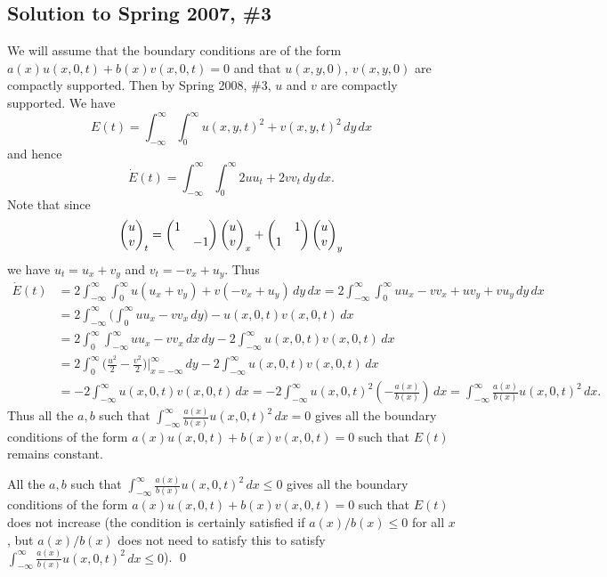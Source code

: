 \subsection*{Solution to Spring 2007, \#3}\label{s073}
We will assume that the boundary conditions are of the form
$a(x)u(x, 0, t) + b(x)v(x, 0, t) = 0$ and that $u(x, y, 0)$, $v(x, y, 0)$
are compactly supported. Then by Spring 2008, \#3, $u$ and $v$ are compactly supported.
We have
$$E(t) = \int_{-\infty}^{\infty}\int_{0}^{\infty}u(x, y, t)^{2} + v(x, y, t)^{2}\, dy\, dx$$
and hence
$$\dot{E}(t) = \int_{-\infty}^{\infty}\int_{0}^{\infty}2uu_{t} + 2vv_{t}\, dy\, dx.$$
Note that since
$$\begin{pmatrix} u \\ v\end{pmatrix}_{t} = \begin{pmatrix} 1 &  \\  & -1\end{pmatrix}\begin{pmatrix} u \\ v\end{pmatrix}_{x} + \begin{pmatrix}  & 1 \\ 1 & \end{pmatrix}\begin{pmatrix} u \\ v\end{pmatrix}_{y}$$
we have
$u_{t} = u_{x} + v_{y}$ and $v_{t} = -v_{x} + u_{y}$.
Thus
\begin{align*}
\dot{E}(t) &= 2\int_{-\infty}^{\infty}\int_{0}^{\infty}u(u_{x} + v_{y}) + v(-v_{x} + u_{y})\, dy\, dx = 2\int_{-\infty}^{\infty}\int_{0}^{\infty}uu_{x} - vv_{x} + uv_{y} + vu_{y}\, dy\, dx\\
&=2\int_{-\infty}^{\infty}\bigg(\int_{0}^{\infty}uu_{x} - vv_{x}\, dy\bigg) - u(x, 0, t)v(x, 0, t)\, dx\\
& = 2\int_{0}^{\infty}\int_{-\infty}^{\infty}uu_{x} - vv_{x}\, dx\, dy - 2\int_{-\infty}^{\infty}u(x, 0, t)v(x, 0, t)\, dx\\
&= 2\int_{0}^{\infty}\bigg(\frac{u^{2}}{2} - \frac{v^{2}}{2}\bigg)\bigg|_{x = -\infty}^{\infty}\, dy - 2\int_{-\infty}^{\infty}u(x, 0, t)v(x, 0, t)\, dx\\
&= -2\int_{-\infty}^{\infty}u(x, 0, t)v(x, 0, t)\, dx = -2\int_{-\infty}^{\infty}u(x, 0, t)^{2}(-\frac{a(x)}{b(x)})\, dx = \int_{-\infty}^{\infty}\frac{a(x)}{b(x)}u(x, 0, t)^{2}\, dx.
\end{align*}
Thus all the $a, b$ such that $\int_{-\infty}^{\infty}\frac{a(x)}{b(x)}u(x, 0, t)^{2}\, dx = 0$ gives all the boundary
conditions of the form $a(x)u(x, 0, t) + b(x)v(x, 0, t) = 0$ such that $E(t)$ remains constant.

All the $a, b$ such that $\int_{-\infty}^{\infty}\frac{a(x)}{b(x)}u(x, 0, t)^{2}\, dx \leq 0$ gives all the boundary conditions
of the form $a(x)u(x, 0, t) + b(x)v(x, 0, t) = 0$ such that $E(t)$ does not increase (the condition is certainly satisfied if
$a(x)/b(x) \leq 0$ for all $x$, but $a(x)/b(x)$ does not need to satisfy this to satisfy $\int_{-\infty}^{\infty}\frac{a(x)}{b(x)}u(x, 0, t)^{2}\, dx \leq 0$).
\hfill\qed

